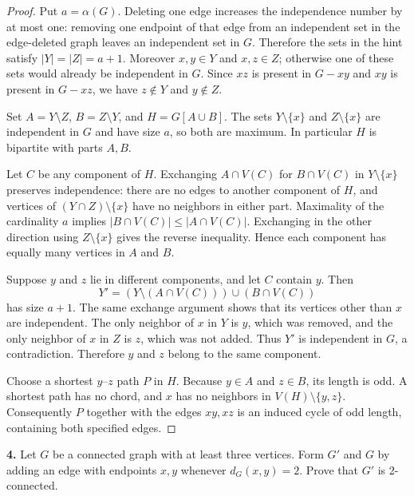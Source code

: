 \documentclass[12pt]{amsart}
\theoremstyle{conjecture}
\theoremstyle{definition}
\theoremstyle{question}
\theoremstyle{theorem}
\begin{document}
    \begin{proof}

    Put $a=\alpha(G)$. Deleting one edge increases the independence
    number by at most one: removing one endpoint of that edge from an
    independent set in the edge-deleted graph leaves an independent set
    in $G$. Therefore the sets in the hint satisfy
    $|Y|=|Z|=a+1$. Moreover $x,y\in Y$ and $x,z\in Z$; otherwise
    one of these sets would already be independent in $G$. Since $xz$
    is present in $G-xy$ and $xy$ is present in $G-xz$, we have
    $z\notin Y$ and $y\notin Z$.

    Set $A=Y\setminus Z$, $B=Z\setminus Y$, and $H=G[A\cup B]$.
    The sets $Y\setminus\{x\}$ and $Z\setminus\{x\}$ are independent
    in $G$ and have size $a$, so both are maximum. In particular $H$
    is bipartite with parts $A,B$.

    Let $C$ be any component of $H$. Exchanging $A\cap V(C)$ for
    $B\cap V(C)$ in $Y\setminus\{x\}$ preserves independence:
    there are no edges to another component of $H$, and vertices of
    $(Y\cap Z)\setminus\{x\}$ have no neighbors in either part.
    Maximality of the cardinality $a$ implies
    $|B\cap V(C)|\le |A\cap V(C)|$. Exchanging in the other direction
    using $Z\setminus\{x\}$ gives the reverse inequality. Hence each
    component has equally many vertices in $A$ and $B$.

    Suppose $y$ and $z$ lie in different components, and let $C$ contain
    $y$. Then
    \[
       Y'=(Y\setminus(A\cap V(C)))\cup(B\cap V(C))
    \]
    has size $a+1$. The same exchange argument shows that its vertices
    other than $x$ are independent. The only neighbor of $x$ in $Y$
    is $y$, which was removed, and the only neighbor of $x$ in $Z$ is
    $z$, which was not added. Thus $Y'$ is independent in $G$, a
    contradiction. Therefore $y$ and $z$ belong to the same component.

    Choose a shortest $y$--$z$ path $P$ in $H$. Because $y\in A$ and
    $z\in B$, its length is odd. A shortest path has no chord, and $x$
    has no neighbors in $V(H)\setminus\{y,z\}$. Consequently $P$
    together with the edges $xy,xz$ is an induced cycle of odd length,
    containing both specified edges.
    \end{proof}

    \noindent\textbf{4.} Let $G$ be a connected graph with at least three vertices.
    Form $G'$ and $G$ by adding an edge with endpoints $x,y$ whenever $d_G(x,y) = 2$.
    Prove that $G'$ is 2-connected.
\end{document}
